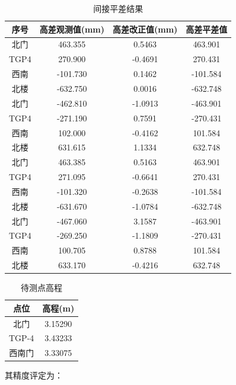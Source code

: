 \documentclass[a4paper,16pt,UTF8]{article}
\begin{document}
\begin{center}
    \begin{longtable}{|c|c|c|c|}
        \caption{间接平差结果} \\ \hline
        序号    & 高差观测值(mm) & 高差改正值(mm) & 高差平差值 \\ \hline
        北门    & 463.355  & 0.5463 & 463.901 \\ \hline
        TGP4    & 270.900  & -0.4691 & 270.431 \\ \hline
        西南    & -101.730 & 0.1462 & -101.584 \\ \hline
        北楼    & -632.750 & 0.0016 & -632.748 \\ \hline
        北门    & -462.810 & -1.0913 & -463.901 \\ \hline
        TGP4   & -271.190 & 0.7591 & -270.431 \\ \hline
        西南    & 102.000  & -0.4162 & 101.584 \\ \hline
        北楼    & 631.615  & 1.1334 & 632.748 \\ \hline
        北门    & 463.385  & 0.5163 & 463.901 \\ \hline
        TGP4    & 271.095  & -0.6641 & 270.431 \\ \hline
        西南    & -101.320 & -0.2638 & -101.584 \\ \hline
        北楼    & -631.670 & -1.0784 & -632.748 \\ \hline
        北门    & -467.060 & 3.1587 & -463.901 \\ \hline
        TGP4    & -269.250 & -1.1809 & -270.431 \\ \hline
        西南    & 100.705  & 0.8788 & 101.584 \\ \hline
        北楼    & 633.170  & -0.4216 & 632.748 \\ \hline 
    \end{longtable}

    \begin{longtable}{|c|c|}
        \caption{待测点高程} \\ \hline
        点位 & 高程(m)  \\ \hline
        北门 & 3.15290   \\ \hline
        TGP-4 & 3.43233 \\ \hline
        西南门 & 3.33075 \\ \hline
    \end{longtable}

    \begin{flushleft}
        其精度评定为：


\end{flushleft}
\end{center}
\end{document}
